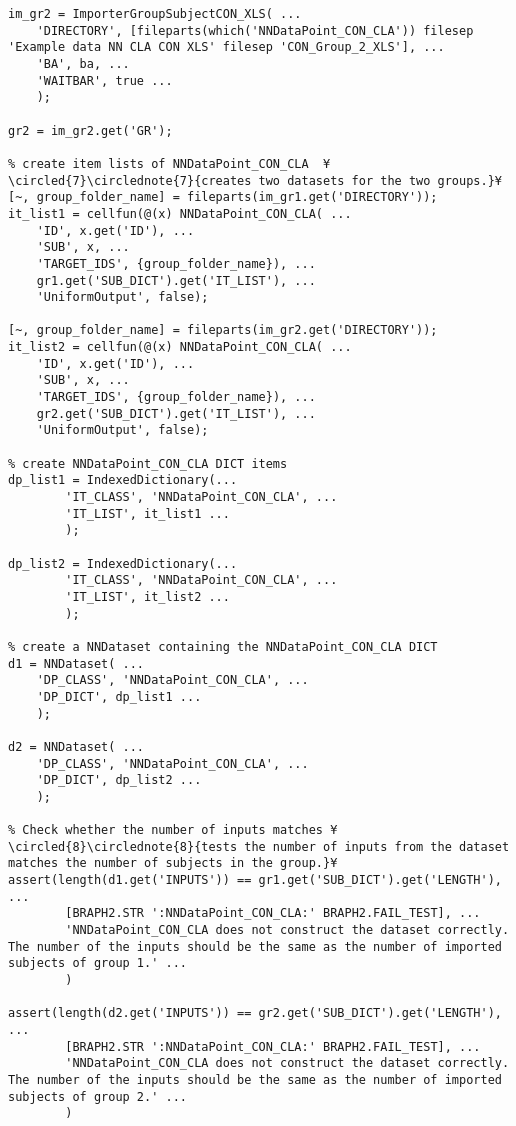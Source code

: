 \documentclass{tufte-handout}
\begin{document}
\begin{lstlisting}
im_gr2 = ImporterGroupSubjectCON_XLS( ...
    'DIRECTORY', [fileparts(which('NNDataPoint_CON_CLA')) filesep 'Example data NN CLA CON XLS' filesep 'CON_Group_2_XLS'], ...
    'BA', ba, ...
    'WAITBAR', true ...
    );

gr2 = im_gr2.get('GR');

% create item lists of NNDataPoint_CON_CLA  ¥\circled{7}\circlednote{7}{creates two datasets for the two groups.}¥
[~, group_folder_name] = fileparts(im_gr1.get('DIRECTORY'));
it_list1 = cellfun(@(x) NNDataPoint_CON_CLA( ...
    'ID', x.get('ID'), ...
    'SUB', x, ...
    'TARGET_IDS', {group_folder_name}), ...
    gr1.get('SUB_DICT').get('IT_LIST'), ...
    'UniformOutput', false);

[~, group_folder_name] = fileparts(im_gr2.get('DIRECTORY'));
it_list2 = cellfun(@(x) NNDataPoint_CON_CLA( ...
    'ID', x.get('ID'), ...
    'SUB', x, ...
    'TARGET_IDS', {group_folder_name}), ...
    gr2.get('SUB_DICT').get('IT_LIST'), ...
    'UniformOutput', false);

% create NNDataPoint_CON_CLA DICT items
dp_list1 = IndexedDictionary(...
        'IT_CLASS', 'NNDataPoint_CON_CLA', ...
        'IT_LIST', it_list1 ...
        );

dp_list2 = IndexedDictionary(...
        'IT_CLASS', 'NNDataPoint_CON_CLA', ...
        'IT_LIST', it_list2 ...
        );

% create a NNDataset containing the NNDataPoint_CON_CLA DICT
d1 = NNDataset( ...
    'DP_CLASS', 'NNDataPoint_CON_CLA', ...
    'DP_DICT', dp_list1 ...
    );

d2 = NNDataset( ...
    'DP_CLASS', 'NNDataPoint_CON_CLA', ...
    'DP_DICT', dp_list2 ...
    );

% Check whether the number of inputs matches ¥\circled{8}\circlednote{8}{tests the number of inputs from the dataset matches the number of subjects in the group.}¥
assert(length(d1.get('INPUTS')) == gr1.get('SUB_DICT').get('LENGTH'), ...
		[BRAPH2.STR ':NNDataPoint_CON_CLA:' BRAPH2.FAIL_TEST], ...
		'NNDataPoint_CON_CLA does not construct the dataset correctly. The number of the inputs should be the same as the number of imported subjects of group 1.' ...
		)

assert(length(d2.get('INPUTS')) == gr2.get('SUB_DICT').get('LENGTH'), ...
		[BRAPH2.STR ':NNDataPoint_CON_CLA:' BRAPH2.FAIL_TEST], ...
		'NNDataPoint_CON_CLA does not construct the dataset correctly. The number of the inputs should be the same as the number of imported subjects of group 2.' ...
		)


\end{lstlisting}
\end{document}
